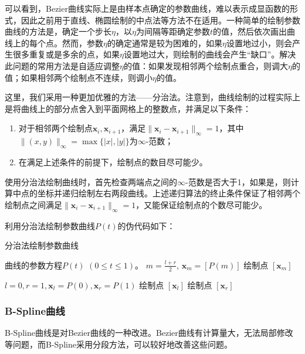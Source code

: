 \documentclass[a4paper,12pt]{article}
\begin{document}
可以看到，Bezier曲线实际上是由样本点确定的参数曲线，难以表示成显函数的形式，因此之前用于直线、椭圆绘制的中点法等方法不在适用。一种简单的绘制参数曲线的方法是，确定一个步长$\eta$，以$\eta$为间隔等距确定参数$t$的值，然后依次画出曲线上的每个点。然而，参数$\eta$的确定通常是较为困难的，如果$\eta$设置地过小，则会产生很多重复或是多余的点，如果$\eta$设置地过大，则绘制的曲线会产生“缺口”。解决此问题的常用方法是自适应调整$\eta$的值：如果发现相邻两个绘制点重合，则调大$\eta$的值；如果相邻两个绘制点不连续，则调小$\eta$的值。

这里，我们采用一种更加优雅的方法——分治法。注意到，曲线绘制的过程实际上是将曲线上的部分点舍入到平面网格上的整数点，并满足以下条件：

\begin{enumerate}
	\item 对于相邻两个绘制点$\bm{x}_i, \bm{x}_{i+1}$，满足$\|\bm{x}_i - \bm{x}_{i+1}\|_{\infty} = 1$，其中$\| (x, y) \|_{\infty} = \max\{|x|, |y|\}$为$\infty$-范数；
	\item 在满足上述条件的前提下，绘制点的数目尽可能少。
\end{enumerate}

使用分治法绘制曲线时，首先检查两端点之间的$\infty$-范数是否大于1，如果是，则计算中点的坐标并递归绘制左右两段曲线。上述递归算法的终止条件保证了相邻两个绘制点之间满足$\|\bm{x}_i - \bm{x}_{i+1}\|_{\infty} = 1$，又能保证绘制点的个数尽可能少。

利用分治法绘制参数曲线$P(t)$的伪代码如下：

\begin{algorithm}[htb] 
	\caption{分治法绘制参数曲线} 
	\label{alg:CurveDC} 
	\begin{algorithmic}[1] 
		\Require 曲线的参数方程$P(t)$ $(0 \leq t \leq 1)$。
		\State \Return
		\Else
		\State $m = \frac{l+r}{2}$, $\bm{x}_m = [P(m)]$
		\State {}
		\State 绘制点 $[\bm{x}_m]$
		\State {}
		\EndIf
		\EndFunction
		
		\State $l = 0, r = 1, \bm{x}_l = P(0), \bm{x}_r = P(1)$
		\State 绘制点 $[\bm{x}_l]$
		\State {}
		\State 绘制点 $[\bm{x}_r]$
	\end{algorithmic} 
\end{algorithm}

\subsubsection{B-Spline曲线}
B-Spline曲线\cite{wiki:BSpline}是对Bezier曲线的一种改进。Bezier曲线有计算量大，无法局部修改等问题，而B-Spline采用分段方法，可以较好地改善这些问题。
\end{document}
